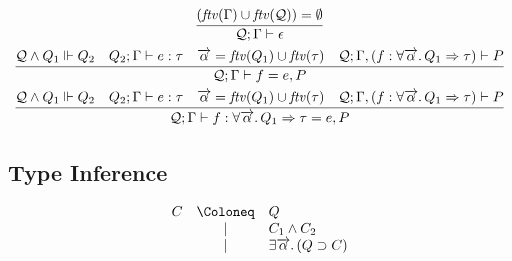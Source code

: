 \begin{gather*}
  \infer{\mathcal{Q}; \Gamma \vdash \epsilon}{
    (\mathit{ftv}(\Gamma) \cup \mathit{ftv}(\mathcal{Q})) = \emptyset
  }
  \\
  \infer{\mathcal{Q}; \Gamma \vdash f = e, P}{
    \mathcal{Q} \land Q_1 \Vdash Q_2
    &
    Q_2; \Gamma \vdash e: \tau
    &
    \overrightarrow{\alpha} = \mathit{ftv}(Q_1) \cup \mathit{ftv}(\tau)
    &
    \mathcal{Q}; \Gamma, (f: \forall \overrightarrow{\alpha}\ldotp Q_1 \Rightarrow \tau) \vdash P
  }
  \\
  \infer{\mathcal{Q}; \Gamma \vdash f: \forall \overrightarrow{\alpha}\ldotp Q_1 \Rightarrow \tau = e, P}{
    \mathcal{Q} \land Q_1 \Vdash Q_2
    &
    Q_2; \Gamma \vdash e: \tau
    &
    \overrightarrow{\alpha} = \mathit{ftv}(Q_1) \cup \mathit{ftv}(\tau)
    &
    \mathcal{Q}; \Gamma, (f: \forall \overrightarrow{\alpha}\ldotp Q_1 \Rightarrow \tau) \vdash P
  }
\end{gather*}

\subsection{Type Inference}

\begin{align*}
  \begin{array}{rcl}
    C
    &\Coloneq &Q \\
    &\mid &C_1 \land C_2 \\
    &\mid &\exists \overrightarrow{\alpha}\ldotp (Q \supset C)
  \end{array}
\end{align*}

